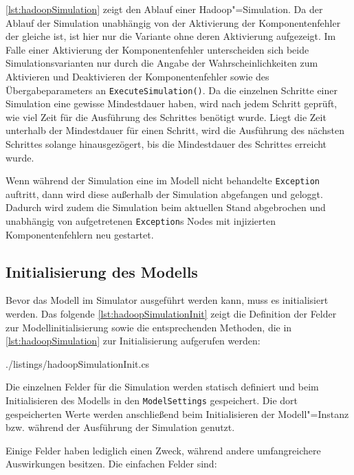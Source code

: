 \autoref{lst:hadoopSimulation} zeigt den Ablauf einer Hadoop"=Simulation.
Da der Ablauf der Simulation unabhängig von der Aktivierung der Komponentenfehler der gleiche ist, ist hier nur die Variante ohne deren Aktivierung aufgezeigt.
Im Falle einer Aktivierung der Komponentenfehler unterscheiden sich beide Simulationsvarianten nur durch die Angabe der Wahrscheinlichkeiten zum Aktivieren und Deaktivieren der Komponentenfehler sowie des Übergabeparameters an \texttt{ExecuteSimulation()}.
Da die einzelnen Schritte einer Simulation eine gewisse Mindestdauer haben, wird nach jedem Schritt geprüft, wie viel Zeit für die Ausführung des Schrittes benötigt wurde.
Liegt die Zeit unterhalb der Mindestdauer für einen Schritt, wird die Ausführung des nächsten Schrittes solange hinausgezögert, bis die Mindestdauer des Schrittes erreicht wurde.

Wenn während der Simulation eine im Modell nicht behandelte \texttt{Exception} auftritt, dann wird diese außerhalb der Simulation abgefangen und geloggt.
Dadurch wird zudem die Simulation beim aktuellen Stand abgebrochen und unabhängig von aufgetretenen \texttt{Exception}s Nodes mit injizierten Komponentenfehlern neu gestartet.

\subsection{Initialisierung des Modells}
\label{sec:simulationModelInit}

Bevor das Modell im Simulator ausgeführt werden kann, muss es initialisiert werden.
Das folgende \autoref{lst:hadoopSimulationInit} zeigt die Definition der Felder zur Modellinitialisierung sowie die entsprechenden Methoden, die in \autoref{lst:hadoopSimulation} zur Initialisierung aufgerufen werden:


{./listings/hadoopSimulationInit.cs}

Die einzelnen Felder für die Simulation werden statisch definiert und beim Initialisieren des Modells in den \texttt{ModelSettings} gespeichert.
Die dort gespeicherten Werte werden anschließend beim Initialisieren der Modell"=Instanz bzw. während der Ausführung der Simulation genutzt.

Einige Felder haben lediglich einen Zweck, während andere umfangreichere Auswirkungen besitzen.
Die einfachen Felder sind:

